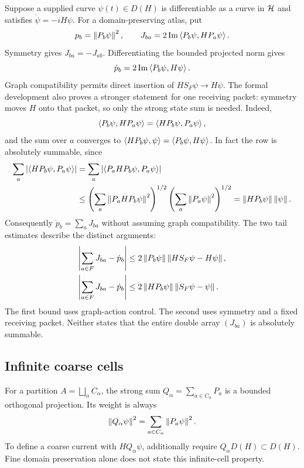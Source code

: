 Suppose a supplied curve $\psi(t)\in D(H)$ is differentiable as a curve in $\mathcal H$ and satisfies $\dot\psi=-iH\psi$. For a domain-preserving atlas, put
\[
 p_b=\left\lVert P_b\psi\right\rVert^2,\qquad
 J_{ba}=2\operatorname{Im}\left\langle P_b\psi,HP_a\psi\right\rangle.
\]
Symmetry gives $J_{ba}=-J_{ab}$. Differentiating the bounded projected norm gives
\[
 \dot p_b=2\operatorname{Im}\left\langle P_b\psi,H\psi\right\rangle.
\]
Graph compatibility permits direct insertion of $HS_F\psi\to H\psi$. The formal development also proves a stronger statement for one receiving packet: symmetry moves $H$ onto that packet, so only the strong state sum is needed. Indeed,
\[
 \left\langle P_b\psi,HP_a\psi\right\rangle=\left\langle HP_b\psi,P_a\psi\right\rangle,
\]
and the sum over $a$ converges to $\left\langle HP_b\psi,\psi\right\rangle=\left\langle P_b\psi,H\psi\right\rangle$. In fact the row is absolutely summable, since
\begin{align*}
 \sum_a\left|\left\langle HP_b\psi,P_a\psi\right\rangle\right|
 &=\sum_a\left|\left\langle P_aHP_b\psi,P_a\psi\right\rangle\right|\\
 &\leq\left(\sum_a\left\lVert P_aHP_b\psi\right\rVert^2\right)^{1/2}
       \left(\sum_a\left\lVert P_a\psi\right\rVert^2\right)^{1/2}
 =\left\lVert HP_b\psi\right\rVert\left\lVert\psi\right\rVert.
\end{align*}
Consequently $\dot p_b=\sum_aJ_{ba}$ without assuming graph compatibility. The two tail estimates describe the distinct arguments:
\begin{align}
 \left|\sum_{a\in F}J_{ba}-\dot p_b\right|
 &\leq2\left\lVert P_b\psi\right\rVert\left\lVert HS_F\psi-H\psi\right\rVert,\label{eq:foundation-graph-row}\\
 \left|\sum_{a\in F}J_{ba}-\dot p_b\right|
 &\leq2\left\lVert HP_b\psi\right\rVert\left\lVert S_F\psi-\psi\right\rVert.\label{eq:foundation-strong-row}
\end{align}
The first bound uses graph-action control. The second uses symmetry and a fixed receiving packet. Neither states that the entire double array $(J_{ba})$ is absolutely summable.

\subsection{Infinite coarse cells}

For a partition $A=\bigsqcup_{\alpha}C_\alpha$, the strong sum $Q_\alpha=\sum_{a\in C_\alpha}P_a$ is a bounded orthogonal projection. Its weight is always
\[
 \left\lVert Q_\alpha\psi\right\rVert^2=\sum_{a\in C_\alpha}\left\lVert P_a\psi\right\rVert^2.
\]
To define a coarse current with $HQ_\alpha\psi$, additionally require $Q_\alpha D(H)\subset D(H)$. Fine domain preservation alone does not state this infinite-cell property.

